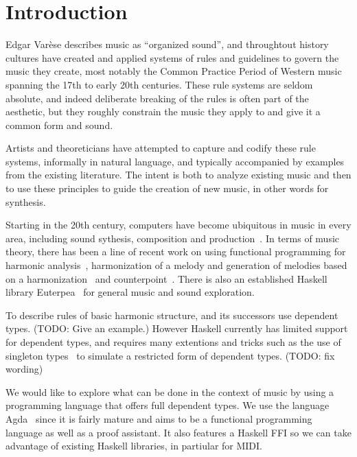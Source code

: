 \section{Introduction}
\label{sec:intro}

Edgar Var\`{e}se describes music as ``organized sound'', and
throughtout history cultures have created and applied systems of rules
and guidelines to govern the music they create, most notably the
Common Practice Period of Western music spanning the 17th to early
20th centuries. These rule systems are seldom absolute, and indeed
deliberate breaking of the rules is often part of the aesthetic, but they
roughly constrain the music they apply to and
give it a common form and sound.

Artists and theoreticians have attempted to capture and codify these
rule systems, informally in natural language, and typically
accompanied by examples from the existing literature. The intent is
both to analyze existing music and then to use these principles to
guide the creation of new music, in other words for synthesis.

Starting in the 20th century, computers have become ubiquitous in
music in every area, including sound sythesis, composition and
production~\citep{roads-tutorial}. In terms of music theory, there has
been a line of recent work on using functional programming for
harmonic
analysis~\citep{magalhaes-harmtrace,dehaas-harmtrace-a,dehaas-harmtrace-b},
harmonization of a melody and generation of melodies based on a
harmonization~\citep{koops-fharm,magalhaes-fcomp} and
counterpoint~\citep{szamozvancev-welltyped}. There is also an
established Haskell library Euterpea~\citep{hudak-haskell} for general music
and sound exploration.

To describe rules of basic harmonic structure,
\citet{magalhaes-harmtrace} and its successors use dependent
types. (TODO: Give an example.) However Haskell currently has limited
support for dependent types, and requires many extentions and tricks
such as the use of singleton types~\citep{eisenberg-singleton} to
simulate a restricted form of dependent types. (TODO: fix wording)

We would like to explore what can be done in the context of music by
using a programming language that offers full dependent types. We use
the language Agda~\citep{norell-phd} since it is fairly mature and
aims to be a functional programming language as well as a proof
assistant. It also features a Haskell FFI so we can take advantage of
existing Haskell libraries, in partiular for MIDI.

